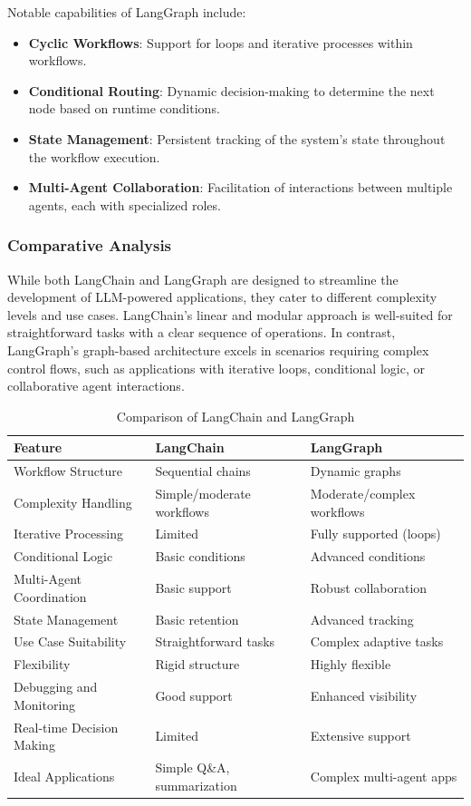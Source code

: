 Notable capabilities of LangGraph include:
\begin{itemize}
    \item \textbf{Cyclic Workflows}: Support for loops and iterative processes within workflows.
    \item \textbf{Conditional Routing}: Dynamic decision-making to determine the next node based on runtime conditions.
    \item \textbf{State Management}: Persistent tracking of the system’s state throughout the workflow execution.
    \item \textbf{Multi-Agent Collaboration}: Facilitation of interactions between multiple agents, each with specialized roles.
\end{itemize}

\subsubsection{Comparative Analysis}
While both LangChain and LangGraph are designed to streamline the development of LLM-powered applications, they cater to different complexity levels and use cases. LangChain’s linear and modular approach is well-suited for straightforward tasks with a clear sequence of operations. In contrast, LangGraph’s graph-based architecture excels in scenarios requiring complex control flows, such as applications with iterative loops, conditional logic, or collaborative agent interactions.

\begin{table}[ht!]
    \centering
    \small
    \begin{tabularx}{\textwidth}{|l|X|X|}
        \hline
        \textbf{Feature} & \textbf{LangChain} & \textbf{LangGraph} \\
        \hline
        Workflow Structure & Sequential chains & Dynamic graphs \\
        Complexity Handling & Simple/moderate workflows & Moderate/complex workflows \\
        Iterative Processing & Limited & Fully supported (loops) \\
        Conditional Logic & Basic conditions & Advanced conditions \\
        Multi-Agent Coordination & Basic support & Robust collaboration \\
        State Management & Basic retention & Advanced tracking \\
        Use Case Suitability & Straightforward tasks & Complex adaptive tasks \\
        Flexibility & Rigid structure & Highly flexible \\
        Debugging and Monitoring & Good support & Enhanced visibility \\
        Real-time Decision Making & Limited & Extensive support \\
        Ideal Applications & Simple Q\&A, summarization & Complex multi-agent apps \\
        \hline
    \end{tabularx}
    \caption{Comparison of LangChain and LangGraph}
    \label{tab:langchain_langgraph_comparison}
\end{table}

